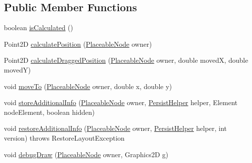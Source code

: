 \subsection*{Public Member Functions}
\begin{DoxyCompactItemize}
\item 
boolean \hyperlink{classorg_1_1tzi_1_1use_1_1gui_1_1views_1_1diagrams_1_1elements_1_1positioning_1_1_strategy_unmovable_a7ad88f7e5d202dcdeb546e2342bdf980}{is\-Calculated} ()
\item 
Point2\-D \hyperlink{classorg_1_1tzi_1_1use_1_1gui_1_1views_1_1diagrams_1_1elements_1_1positioning_1_1_strategy_unmovable_ad1c4fd3d48b732fdfdc24123d9ec8d00}{calculate\-Position} (\hyperlink{classorg_1_1tzi_1_1use_1_1gui_1_1views_1_1diagrams_1_1elements_1_1_placeable_node}{Placeable\-Node} owner)
\item 
Point2\-D \hyperlink{classorg_1_1tzi_1_1use_1_1gui_1_1views_1_1diagrams_1_1elements_1_1positioning_1_1_strategy_unmovable_a885b8ba5f61d07ae5f3658cdafe906c9}{calculate\-Dragged\-Position} (\hyperlink{classorg_1_1tzi_1_1use_1_1gui_1_1views_1_1diagrams_1_1elements_1_1_placeable_node}{Placeable\-Node} owner, double moved\-X, double moved\-Y)
\item 
void \hyperlink{classorg_1_1tzi_1_1use_1_1gui_1_1views_1_1diagrams_1_1elements_1_1positioning_1_1_strategy_unmovable_a26c502a4faa272ed2efe6cae02e0b05e}{move\-To} (\hyperlink{classorg_1_1tzi_1_1use_1_1gui_1_1views_1_1diagrams_1_1elements_1_1_placeable_node}{Placeable\-Node} owner, double x, double y)
\item 
void \hyperlink{classorg_1_1tzi_1_1use_1_1gui_1_1views_1_1diagrams_1_1elements_1_1positioning_1_1_strategy_unmovable_a108c67b3a51bc3997fbdfc3448bde2f7}{store\-Additional\-Info} (\hyperlink{classorg_1_1tzi_1_1use_1_1gui_1_1views_1_1diagrams_1_1elements_1_1_placeable_node}{Placeable\-Node} owner, \hyperlink{classorg_1_1tzi_1_1use_1_1gui_1_1util_1_1_persist_helper}{Persist\-Helper} helper, Element node\-Element, boolean hidden)
\item 
void \hyperlink{classorg_1_1tzi_1_1use_1_1gui_1_1views_1_1diagrams_1_1elements_1_1positioning_1_1_strategy_unmovable_a3ebdf3fc29e43632e0a7c8a6e821cc94}{restore\-Additional\-Info} (\hyperlink{classorg_1_1tzi_1_1use_1_1gui_1_1views_1_1diagrams_1_1elements_1_1_placeable_node}{Placeable\-Node} owner, \hyperlink{classorg_1_1tzi_1_1use_1_1gui_1_1util_1_1_persist_helper}{Persist\-Helper} helper, int version)  throws Restore\-Layout\-Exception 
\item 
void \hyperlink{classorg_1_1tzi_1_1use_1_1gui_1_1views_1_1diagrams_1_1elements_1_1positioning_1_1_strategy_unmovable_a2119721deb1720617397286d95fb50f5}{debug\-Draw} (\hyperlink{classorg_1_1tzi_1_1use_1_1gui_1_1views_1_1diagrams_1_1elements_1_1_placeable_node}{Placeable\-Node} owner, Graphics2\-D g)

\end{DoxyCompactItemize}
